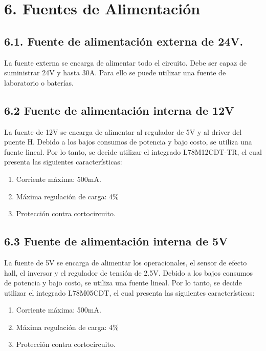 \documentclass{article} %
\begin{document}
\noindent 
\section{6. Fuentes de Alimentaci\'{o}n}

\noindent 
\subsection{6.1. Fuente de alimentaci\'{o}n externa de 24V.}

\noindent La fuente externa se encarga de alimentar todo el circuito. Debe ser capaz de suministrar 24V y hasta 30A. Para ello se puede utilizar una fuente de laboratorio o bater\'{i}as.

\noindent 
\subsection{6.2 Fuente de alimentaci\'{o}n interna de 12V}

\noindent La fuente de 12V se encarga de alimentar al regulador de 5V y al driver del puente H. Debido a los bajos consumos de potencia y bajo costo, se utiliza una fuente lineal. Por lo tanto, se decide utilizar el integrado L78M12CDT-TR, el cual presenta las siguientes caracter\'{i}sticas:

\begin{enumerate}
\item  Corriente m\'{a}xima: 500mA.

\item  M\'{a}xima regulaci\'{o}n de carga: 4\%

\item  Protecci\'{o}n contra cortocircuito.
\end{enumerate}

\noindent 
\subsection{6.3 Fuente de alimentaci\'{o}n interna de 5V}

\noindent La fuente de 5V se encarga de alimentar los operacionales, el sensor de efecto hall, el inversor y el regulador de tensi\'{o}n de 2.5V. Debido a los bajos consumos de potencia y bajo costo, se utiliza una fuente lineal. Por lo tanto, se decide utilizar el integrado L78M05CDT, el cual presenta las siguientes caracter\'{i}sticas:

\begin{enumerate}
\item  Corriente m\'{a}xima: 500mA.

\item  M\'{a}xima regulaci\'{o}n de carga: 4\%

\item  Protecci\'{o}n contra cortocircuito.
\end{enumerate}
\end{document}
